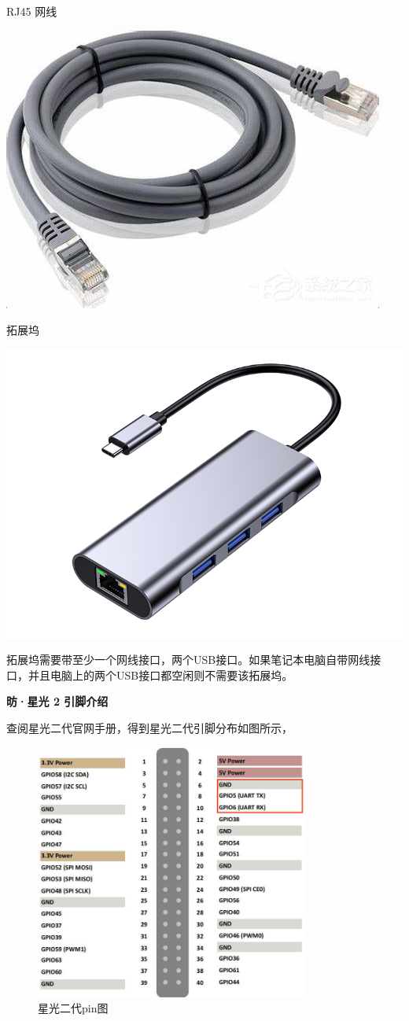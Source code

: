 {	\raggedright
	\setlength{\parindent}{2em}
	 RJ45 网线
	
	\centering
	\includegraphics[width=0.5\linewidth]{figures/08-03-RJ45网线.jpg}
	
	\raggedright
	\setlength{\parindent}{2em}
	 拓展坞
	
	\centering
	\includegraphics[width=0.5\linewidth]{figures/08-02-拓展坞.jpg}
	
	\raggedright
	\setlength{\parindent}{2em}
	拓展坞需要带至少一个网线接口，两个USB接口。如果笔记本电脑自带网线接口，并且电脑上的两个USB接口都空闲则不需要该拓展坞。
}

\textbf{昉·星光 2 引脚介绍}

查阅星光二代官网手册，得到星光二代引脚分布如图所示，
\begin{figure}[ht]
	\centering
	\includegraphics[width=0.8\textwidth]{figures/08-02-星光二代pin图.jpg}
	\caption{星光二代pin图}
\end{figure}

